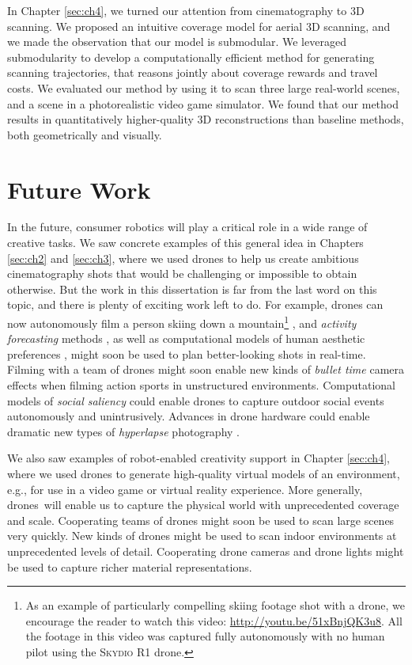 In Chapter \ref{sec:ch4}, we turned our attention from cinematography to 3D scanning.
We proposed an intuitive coverage model for aerial 3D scanning, and we made the observation that our model is submodular.
We leveraged submodularity to develop a computationally efficient method for generating scanning trajectories, that reasons jointly about coverage rewards and travel costs.
We evaluated our method by using it to scan three large real-world scenes, and a scene in a photorealistic video game simulator.
We found that our method results in quantitatively higher-quality 3D reconstructions than baseline methods, both geometrically and visually.

\section{Future Work}

In the future, consumer robotics will play a critical role in a wide range of creative tasks. 
We saw concrete examples of this general idea in Chapters \ref{sec:ch2} and \ref{sec:ch3}, where we used drones to help us create ambitious cinematography shots that would be challenging or impossible to obtain otherwise.
But the work in this dissertation is far from the last word on this topic, and there is plenty of exciting work left to do.
For example, drones can now autonomously film a person skiing down a mountain\footnote{As an example of particularly compelling skiing footage shot with a drone, we encourage the reader to watch this video: \url{http://youtu.be/51xBnjQK3u8}. All the footage in this video was captured fully autonomously with no human pilot using the \textsc{Skydio R1} drone.} \cite{skydio:2018}, and \emph{activity forecasting} methods \cite{kitani:2012}, as well as computational models of human aesthetic preferences \cite{secord:2011}, might soon be used to plan better-looking shots in real-time.
Filming with a team of drones \cite{nageli:2017} might soon enable new kinds of \emph{bullet time} camera effects \cite{zitnick:2004} when filming action sports in unstructured environments. Computational models of \emph{social saliency} \cite{arev:2014,park:2012} could enable drones to capture outdoor social events autonomously and unintrusively.
Advances in drone hardware could enable dramatic new types of \emph{hyperlapse} photography \cite{kopf:2014}.

We also saw examples of robot-enabled creativity support in Chapter \ref{sec:ch4}, where we used drones to generate high-quality virtual models of an environment, e.g., for use in a video game or virtual reality experience.
More generally, drones\ will enable us to capture the physical world with unprecedented coverage and scale.
Cooperating teams of drones might soon be used to scan large scenes very quickly.
New kinds of drones might be used to scan indoor environments at unprecedented levels of detail. Cooperating drone cameras and drone lights might be used to capture richer material representations.

